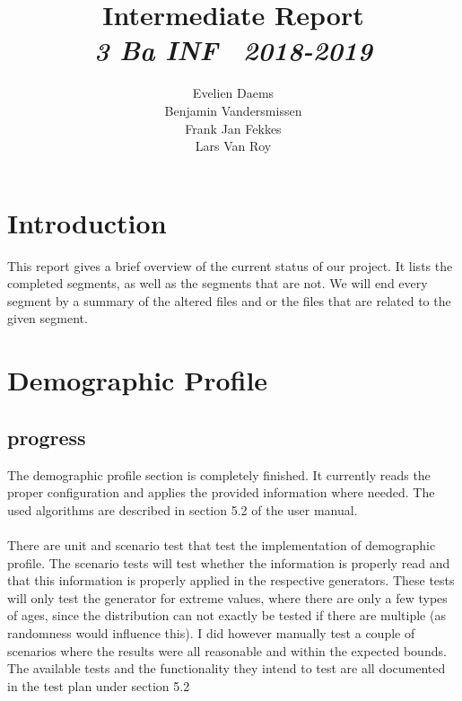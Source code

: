 \documentclass[runningheads]{llncs}
\begin{document}
	\title{Intermediate Report\\\vspace{0.1in}\small{\textit{3 Ba INF \  2018-2019}}}
	\author{Evelien Daems \\ Benjamin Vandersmissen \\ Frank Jan Fekkes \\ Lars Van Roy}
	\institute{}
	\maketitle
	
	\section{Introduction}
	This report gives a brief overview of the current status of our project. It lists the completed segments, as well as the segments that are not. We will end every segment by a summary of the altered files and or the files that are related to the given segment.
	
	\section{Demographic Profile}
	\subsection{progress}
	The demographic profile section is completely finished. It currently reads the proper configuration and applies the provided information where needed. The used algorithms are described in section 5.2 of the user manual.\\
	\\
	There are unit and scenario test that test the implementation of demographic profile. The scenario tests will test whether the information is properly read and that this information is properly applied in the respective generators. These tests will only test the generator for extreme values, where there are only a few types of ages, since the distribution can not exactly be tested if there are multiple (as randomness would influence this). I did however manually test a couple of scenarios where the results were all reasonable and within the expected bounds. The available tests and the functionality they intend to test are all documented in the test plan under section 5.2
	
\end{document}
